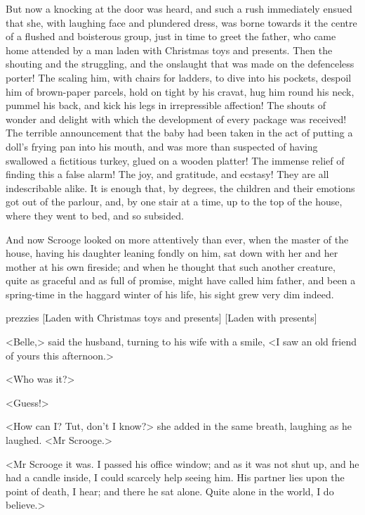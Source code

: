 But now a knocking at the door was heard, and such a rush immediately ensued
that she, with laughing face and plundered dress, was borne towards it the
centre of a flushed and boisterous group, just in time to greet the father, who
came home attended by a man laden with Christmas toys and presents. Then the
shouting and the struggling, and the onslaught that was made on the defenceless
porter! The scaling him, with chairs for ladders, to dive into his pockets,
despoil him of brown-paper parcels, hold on tight by his cravat, hug him round
his neck, pummel his back, and kick his legs in irrepressible affection! The
shouts of wonder and delight with which the development of every package was
received! The terrible announcement that the baby had been taken in the act of
putting a doll's frying pan into his mouth, and was more than suspected of
having swallowed a fictitious turkey, glued on a wooden platter! The immense
relief of finding this a false alarm! The joy, and gratitude, and ecstasy! They
are all indescribable alike. It is enough that, by degrees, the children and
their emotions got out of the parlour, and, by one stair at a time, up to the
top of the house, where they went to bed, and so subsided.

And now Scrooge looked on more attentively than ever, when the master of the
house, having his daughter leaning fondly on him, sat down with her and her
mother at his own fireside; and when he thought that such another creature,
quite as graceful and as full of promise, might have called him father, and been
a spring-time in the haggard winter of his life, his sight grew very dim indeed.

  \begin{colorbigpic}
    [\basicscale] 
    {prezzies}
    [Laden with Christmas toys and presents]
    [Laden with presents]
  \end{colorbigpic}


<Belle,> said the husband, turning to his wife with a smile, <I saw an old
friend of yours this afternoon.>

<Who was it?>

<Guess!>

<How can I\@? Tut, don't I know?> she added in the same breath, laughing as he
laughed. <Mr Scrooge.>

<Mr Scrooge it was. I passed his office window; and as it was not shut up, and
he had a candle inside, I could scarcely help seeing him. His partner lies upon
the point of death, I hear; and there he sat alone. Quite alone in the world, I
do believe.>

